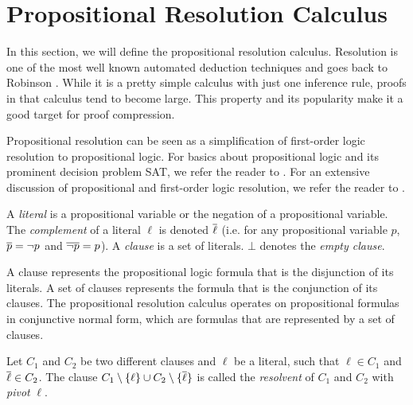\section{Propositional Resolution Calculus}
\label{sec:resolution}

In this section, we will define the propositional resolution calculus.
Resolution is one of the most well known automated deduction techniques and goes back to Robinson \cite{Robinson1965}.
While it is a pretty simple calculus with just one inference rule, proofs in that calculus tend to become large.
This property and its popularity make it a good target for proof compression.

Propositional resolution can be seen as a simplification of first-order logic resolution to propositional logic.
For basics about propositional logic and its prominent decision problem SAT, we refer the reader to \cite{Biere2009}.
For an extensive discussion of propositional and first-order logic resolution, we refer the reader to \cite{Leitsch1997}.

\begin{definition}

A \emph{literal} is a propositional variable or the negation of a propositional variable. 
The \emph{complement} of a literal $\ell$ is denoted $\overline{\ell}$ (i.e. for any propositional variable $p$,
$\overline{p} = \neg p$ and $\overline{\neg p} = p$). 
A \emph{clause} is a set of literals. 
$\bot$ denotes the \emph{empty clause}.

\end{definition}

A clause represents the propositional logic formula that is the disjunction of its literals.
A set of clauses represents the formula that is the conjunction of its clauses.
The propositional resolution calculus operates on propositional formulas in conjunctive normal form, which are formulas that are represented by a set of clauses.

\begin{definition}[Resolvent]

Let $C_1$ and $C_2$ be two different clauses and $\ell$ be a literal, such that $\ell \in C_1$ and $\overline{\ell} \in C_2$.
The clause $C_1 \setminus \{\ell\} \cup C_2 \setminus \{\overline{\ell}\}$ is called the \emph{resolvent} of $C_1$ and $C_2$ with \emph{pivot} $\ell$.

\end{definition}

